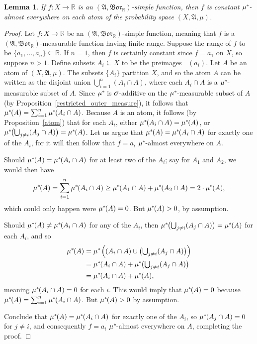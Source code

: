 \documentclass[
twoside=true,
paper=letter,
fontsize=9pt,
pagesize=auto,
leqno,
openany,
headsepline,
overfullrule,
]{scrbook}
\theoremstyle{plain}
\theoremstyle{plain}
\newtheorem{lemma}[thm]{Lemma}
\theoremstyle{definition}
\theoremstyle{bfnoteitalic}
\theoremstyle{bfnoteroman}
\newcommand{\sigalg}[1]{\mathfrak{#1}}
\newcommand{\borel}{\mathfrak{Bor}}
\newcommand{\textsigma}{\hbox{\large{$\sigma$}}\kern-1pt}
\newcommand{\preimage}[1]{\mathop{#1^{\leftarrow}}}
\newcommand{\R}{\mathbb{R}}
\newcommand{\meets}{\cap}
\newcommand{\sigmaalgebra}{\sigalg{A}}
\newcommand{\kernast}{\ast\kern-1pt}
\newcommand{\Pstar}{\measure^\kernast}
\newcommand{\function}{f}
\newcommand{\measurespace}{X}
\newcommand{\measure}{\mu}
\begin{document}
\begin{lemma}\label{atom_lemma}
If $\function:\measurespace\to\R$ is an $(\sigmaalgebra, \borel_\R)$-simple function, then $\function$ is constant 
$\Pstar$-almost everywhere
on each atom of the probability space $(\measurespace, \sigmaalgebra,\measure)$.
\end{lemma}

\begin{proof}
Let $\function:\measurespace\to\R$ be an $(\sigmaalgebra, \borel_\R)$-simple function, meaning that $\function$ is a $(\sigmaalgebra,\borel_\R)$\hyp{}measurable function having finite range. Suppose the range of $\function$ to be $\{a_1,\ldots,a_n\}\subseteq\R$. If $n=1$, then $\function$ is certainly constant since $\function=a_1$ on $\measurespace$, so suppose $n>1$.  Define subsets 
$A_i\subseteq\measurespace$ to be the preimages $\preimage{\function}(a_i)$.  
Let $A$ be an atom of $(\measurespace, \sigmaalgebra,\measure)$. 
The subsets $\{A_i\}$ partition $\measurespace$, and so the atom $A$ can be written as the disjoint union 
$\bigcup_{i=1}^n(A_i\meets A)$, where
\newcommand{\asubimeetsa}{A_i\meets A}
each $\asubimeetsa$ is a $\Pstar$-measurable subset of $A$. 
Since $\Pstar$ is $\textsigma$-additive on the $\Pstar$-measurable subset of $A$ (by Proposition~\ref{restricted_outer_measure}), it follows that 
$\Pstar(A)=\sum_{i=1}^n\Pstar(\asubimeetsa)$.
Because $A$ is an atom, it follows (by Proposition~\ref{atom}) that for each $A_i$, either $\Pstar(\asubimeetsa)=\Pstar(A)$, or 
$\Pstar\bigl(\bigcup_{j\neq i}(A_j\meets A)\bigr) = \Pstar(A)$.
Let us argue that $\Pstar(A) = \Pstar(\asubimeetsa)$ for exactly one of the $A_i$, for it will then follow that $\function = a_i$ $\Pstar$-almost everywhere on $A$.

Should $\Pstar(A) = \Pstar(\asubimeetsa)$ for at least two of the $A_i$; say for $A_1$ and $A_2$, we would then have
\[
\Pstar(A)=\sum_{i=1}^n \Pstar(\asubimeetsa)
\geq
\Pstar(A_1\meets A) + \Pstar(A_2\meets A)
=
2\cdot\Pstar(A),
\]
which could only happen were $\Pstar(A)=0$. But $\Pstar(A)>0$, by assumption.

Should $\Pstar(A) \neq \Pstar(\asubimeetsa)$ for any of the $A_i$, then 
$\Pstar\bigl(\bigcup_{j\neq i}(A_j\meets A)\bigr) = \Pstar(A)$ for each $A_i$, and so
\begin{align*}
\Pstar(A)
& = \Pstar\left((\asubimeetsa)
\cup
\bigl({\textstyle{\bigcup_{j\neq i}}}(A_j\meets A)\bigr)\right)\\
& = \Pstar(\asubimeetsa)
+
\Pstar\bigl( {\textstyle{\bigcup_{j\neq i}}}(A_j\meets A) \bigr)\\
& = \Pstar(\asubimeetsa) + \Pstar(A),\\
\end{align*}
meaning $\Pstar(\asubimeetsa) = 0$ for each $i$. This would imply that $\Pstar(A) = 0$ because 
$\Pstar(A)=\sum_{i=1}^n\Pstar(\asubimeetsa)$. But $\Pstar(A)>0$ by assumption.

Conclude that $\Pstar(A) = \Pstar(\asubimeetsa)$ for exactly one of the $A_i$, so $\Pstar(A_j\meets A)=0$ for $j\neq i$, and consequently $\function=a_i$ $\Pstar$-almost everywhere on $A$, completing the proof.
\end{proof}
\end{document}
